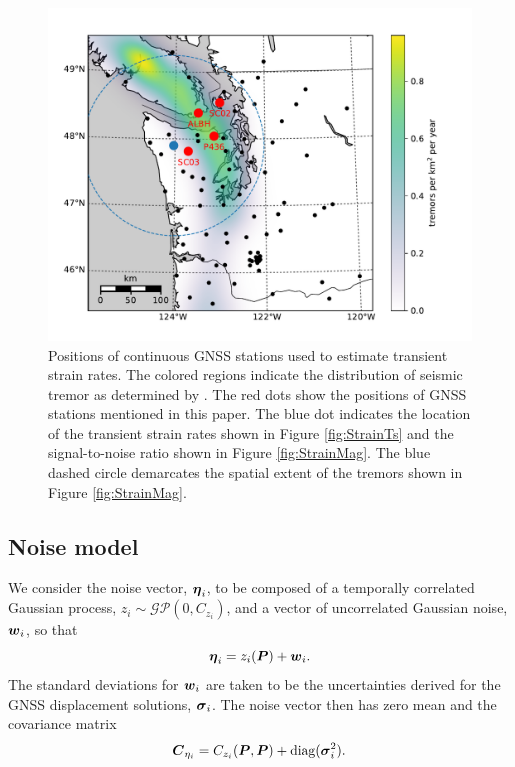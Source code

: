 \documentclass[extra,mreferee]{gji}
\begin{document}
\begin{figure}
\includegraphics{figures/context_map/context-map.pdf}
\caption{
Positions of continuous GNSS stations used to estimate transient
strain rates. The colored regions indicate the distribution of seismic
tremor as determined by \citet{Wech2010}. The red dots show the
positions of GNSS stations mentioned in this paper. The blue dot
indicates the location of the transient strain rates shown in Figure
\ref{fig:StrainTs} and the signal-to-noise ratio shown in Figure
\ref{fig:StrainMag}. The blue dashed circle demarcates the spatial
extent of the tremors shown in Figure \ref{fig:StrainMag}.
}    
\label{fig:Context}
\end{figure}

\subsection{Noise model}\label{sec:NoiseModel}


We consider the noise vector, $\mitbf{\eta}_i$, to be composed of a
temporally correlated Gaussian process, $z_i \sim
\mathcal{GP}(0,C_{z_i})$, and a vector of uncorrelated
Gaussian noise, $\mitbf{w}_i$, so that
\begin{equation}
\mitbf{\eta}_i = z_i(\points) + \mitbf{w}_i.
\end{equation}
The standard deviations for $\mitbf{w}_i$ are taken to be the
uncertainties derived for the GNSS displacement solutions,
$\mitbf{\sigma}_i$. The noise vector then has zero mean and the
covariance matrix
\begin{equation}
\mitbf{C}_{\eta_i} = C_{z_i}(\points,\points) +
                     \mathrm{diag}(\mitbf{\sigma}_i^2).
\end{equation}
\end{document}

